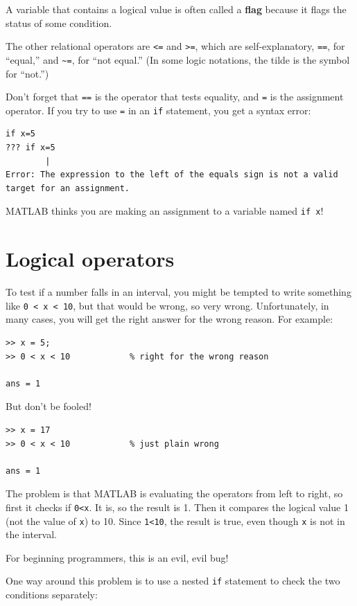 \documentclass{book}
\begin{document}
A variable that contains a logical value is often called a {\bf flag}
because it flags the status of some condition.

The other relational operators are {\tt <=} and {\tt >=}, which are
self-explanatory, {\tt ==}, for ``equal,'' and
\verb+~=+, for ``not equal.''  (In some logic notations, the tilde
is the symbol for ``not.'')

Don't forget that {\tt ==} is the operator that tests equality,
and {\tt =} is the assignment operator.  If you try to use {\tt =} in
an {\tt if} statement, you get a syntax error:

\begin{verbatim}
if x=5
??? if x=5
        |
Error: The expression to the left of the equals sign is not a valid
target for an assignment.
\end{verbatim}

MATLAB thinks you are making an assignment to a variable named {\tt if x}!


\section{Logical operators}
\label{logop}

To test if a number falls in an interval, you might be
tempted to write something like {\tt 0 < x < 10}, but that
would be wrong, so very wrong.  Unfortunately, in many cases,
you will get the right answer for the wrong reason.  For
example:

\begin{verbatim}
>> x = 5;
>> 0 < x < 10            % right for the wrong reason

ans = 1
\end{verbatim}

But don't be fooled!

\begin{verbatim}
>> x = 17
>> 0 < x < 10            % just plain wrong

ans = 1
\end{verbatim}

The problem is that MATLAB is evaluating the operators from left
to right, so first it checks if {\tt 0<x}.  It is, so the result
is 1.  Then it compares the logical value 1 (not the value of
{\tt x}) to 10.  Since {\tt 1<10}, the result is true, even though
{\tt x} is not in the interval.

For beginning programmers, this is an evil, evil bug!

One way around this problem is to use a nested {\tt if} statement to
check the two conditions separately:
\end{document}
